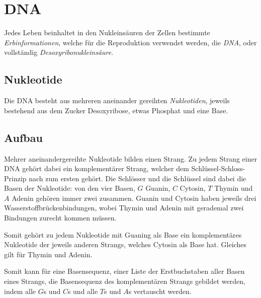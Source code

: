 \documentclass{article}
\begin{document}
\section{DNA} 
Jedes Leben beinhaltet in den Nukleinsäuren der Zellen bestimmte \emph{Erbinformationen}, welche für die Reproduktion verwendet werden, die \emph{DNA}, oder vollständig \emph{Desoxyribonukleinsäure}.
 
\subsection{Nukleotide}
Die DNA besteht aus mehreren aneinander gereihten \emph{Nukleotiden}, jeweils bestehend aus dem Zucker Desoxyribose, etwas Phosphat und eine Base.
 
\subsection{Aufbau}
Mehrer aneinandergereihte Nukleotide bilden einen Strang. Zu jedem Strang einer DNA gehört dabei ein komplementärer Strang, welcher dem Schlüssel-Schloss-Prinzip nach zum ersten gehört. Die Schlösser und die Schlüssel sind dabei die Basen der Nukleotide: von den vier Basen, $G$ Guanin, $C$ Cytosin, $T$ Thymin und $A$ Adenin gehören immer zwei zusammen. Guanin und Cytosin haben jeweils drei Wasserstoffbrückenbindungen, wobei Thymin und Adenin mit gerademal zwei Bindungen zurecht kommen müssen.
 
Somit gehört zu jedem Nukleotide mit Guaning als Base ein komplementäres Nukleotide der jeweils anderen Strangs, welches Cytosin als Base hat. Gleiches gilt für Thymin und Adenin. 
 
Somit kann für eine Basensequenz, einer Liste der Erstbuchstaben aller Basen eines Strangs, die Basensequenz des komplementären Strangs gebildet werden, indem alle $G$s und $C$s und alle $T$s und $A$s vertauscht werden. 
 
\end{document}
